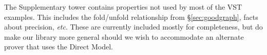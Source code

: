 The Supplementary tower contains properties not used by most of the VST examples.
This includes the fold/unfold relationship from \S\ref{sec:goodgraph}, facts
about precision, \emph{etc}. These are currently included mostly for completeness,
but do make our library more general should we wish to accommodate an alternate
prover that uses the Direct Model.



%



